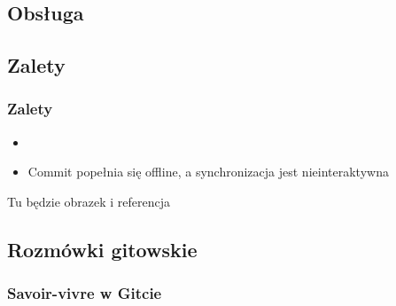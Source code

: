 \documentclass{beamer}
\begin{document}
\subsection{Obsługa}

\subsection{Zalety}
\begin{frame}
\frametitle{Zalety}
\begin{itemize}
 \item 
 \item Commit popełnia się offline, a synchronizacja jest nieinteraktywna
\end{itemize}
 
\end{frame}

\begin{frame}[c]{Tu będzie obrazek i referencja}
\end{frame}

\subsection{Rozmówki gitowskie}
\begin{frame}
 \frametitle{Savoir-vivre w Gitcie}
\end{frame}
\end{document}
